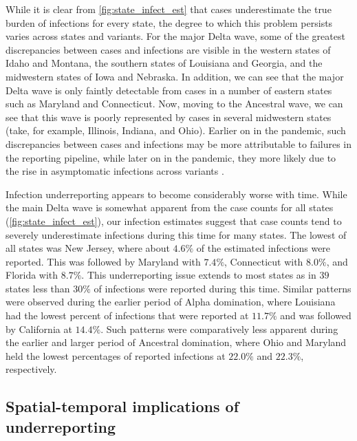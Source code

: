 \documentclass{article}
\begin{document}
While it is clear from \autoref{fig:state_infect_est} that cases underestimate the true burden of infections for every state, the degree to which this problem persists varies across states and variants. For the major Delta wave, some of the greatest discrepancies between cases and
infections are visible in the western states of Idaho and Montana, the southern
states of Louisiana and Georgia, and the midwestern states of Iowa and Nebraska. In addition, we can see that the major Delta wave is only faintly detectable from cases in a number of eastern states such as Maryland and Connecticut. Now, moving to the Ancestral wave, we can see that this wave is poorly represented by cases in several midwestern states (take, for example, Illinois, Indiana, and Ohio). Earlier on in the pandemic, such discrepancies
between cases and infections may be more attributable to failures in the
reporting pipeline, while later on in the pandemic, they more likely due to the
rise in asymptomatic infections across variants \citep{oph2022covid, garrett2022high}. 

Infection underreporting appears to become considerably worse with time. While the main Delta wave is somewhat apparent from the case counts for
all states (\autoref{fig:state_infect_est}), our infection estimates suggest that case
counts tend to severely underestimate infections during this time for many
states. The lowest of all states was New Jersey, where about $4.6\%$
 of the estimated infections were reported. This was followed by Maryland with $7.4\%$, Connecticut with
$8.0\%$, and Florida with $8.7\%$. This
underreporting issue extends to most states as in $39$ states less than $30\%$
of infections were reported during this time. Similar patterns were observed during the earlier period of Alpha domination, where Louisiana had the lowest percent of infections that were reported at $11.7\%$ 
and was followed by California at $14.4\%$. Such patterns were comparatively less apparent during the earlier and larger
period of Ancestral domination, where Ohio and Maryland held the lowest
percentages of reported infections at $22.0\%$ and $22.3\%$,
respectively. 

\subsection{Spatial-temporal implications of underreporting}
\label{sec:ignored-patterns}
\end{document}
